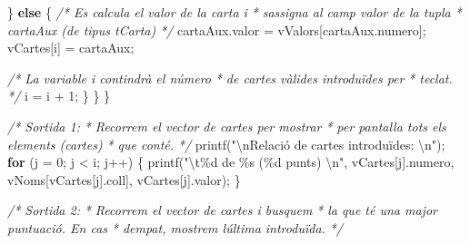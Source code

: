 \documentclass[]{book}
\newenvironment{Shaded}{\begin{snugshade}}{\end{snugshade}}
\newcommand{\CommentTok}[1]{\textcolor[rgb]{0.56,0.35,0.01}{\textit{#1}}}
\newcommand{\ControlFlowTok}[1]{\textcolor[rgb]{0.13,0.29,0.53}{\textbf{#1}}}
\newcommand{\DecValTok}[1]{\textcolor[rgb]{0.00,0.00,0.81}{#1}}
\newcommand{\NormalTok}[1]{#1}
\newcommand{\SpecialCharTok}[1]{\textcolor[rgb]{0.00,0.00,0.00}{#1}}
\newcommand{\StringTok}[1]{\textcolor[rgb]{0.31,0.60,0.02}{#1}}
\begin{document}
\begin{Shaded}
\begin{Highlighting}[]
\NormalTok{            \} }\ControlFlowTok{else}\NormalTok{ \{}
                \CommentTok{/* Es calcula el valor de la carta i }
\CommentTok{                 * s\textquotesingle{}assigna al camp valor de la tupla}
\CommentTok{                 * cartaAux (de tipus tCarta)}
\CommentTok{                 */}
\NormalTok{                cartaAux.valor = vValors[cartaAux.numero];}
\NormalTok{                vCartes[i] = cartaAux;}
                
                \CommentTok{/* La variable i contindrà el número}
\CommentTok{                 * de cartes vàlides introduïdes per}
\CommentTok{                 * teclat.}
\CommentTok{                 */}
\NormalTok{                i = i + }\DecValTok{1}\NormalTok{;}
\NormalTok{            \}}
\NormalTok{        \}}
\NormalTok{    \}}
    
    \CommentTok{/* Sortida 1:}
\CommentTok{     * Recorrem el vector de cartes per mostrar}
\CommentTok{     * per pantalla tots els elements (cartes)}
\CommentTok{     * que conté.}
\CommentTok{     */}
\NormalTok{    printf(}\StringTok{"}\SpecialCharTok{\textbackslash{}n}\StringTok{Relació de cartes introduïdes: }\SpecialCharTok{\textbackslash{}n}\StringTok{"}\NormalTok{);}
    \ControlFlowTok{for}\NormalTok{ (j = }\DecValTok{0}\NormalTok{; j \textless{} i; j++) \{}
\NormalTok{        printf(}\StringTok{"}\SpecialCharTok{\textbackslash{}t}\StringTok{\%d de \%s (\%d punts) }\SpecialCharTok{\textbackslash{}n}\StringTok{"}\NormalTok{, vCartes[j].numero, vNoms[vCartes[j].coll], vCartes[j].valor);}
\NormalTok{    \}}
    
    \CommentTok{/* Sortida 2:}
\CommentTok{     * Recorrem el vector de cartes i busquem}
\CommentTok{     * la que té una major puntuació. En cas }
\CommentTok{     * d\textquotesingle{}empat, mostrem l\textquotesingle{}última introduïda.}
\CommentTok{     */}


\end{Highlighting}
\end{Shaded}
\end{document}
